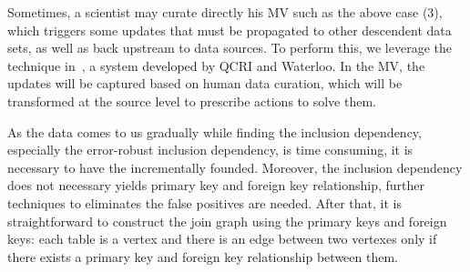 Sometimes, a scientist may curate directly his MV such as the above case (3), which triggers some updates that must be propagated to other descendent data sets, as well as back upstream to data sources. To perform this, we leverage the technique in~\cite{DBLP:conf/sigmod/ChalamallaIOP14}, a system developed by QCRI and Waterloo. In the MV, the updates will be captured based on human data curation, which will be transformed at the source level to prescribe actions to solve them. 


As the data comes to us gradually while finding the inclusion dependency, especially the error-robust inclusion dependency, is time consuming, it is necessary to have the \eind incrementally founded. Moreover, the inclusion dependency does not necessary yields primary key and foreign key relationship, further techniques to eliminates the false positives are needed. After that, it is straightforward to construct the join graph using the primary keys and foreign keys: each table is a vertex and there is an edge between two vertexes only if there exists a primary key and foreign key relationship between them. 
